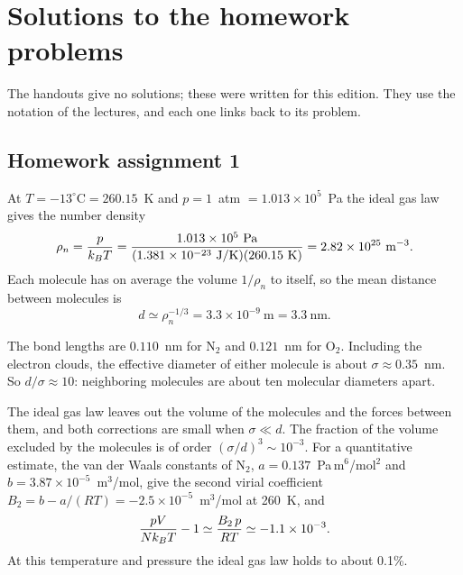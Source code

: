 \section{Solutions to the homework problems}\label{sec:solutions}

The handouts give no solutions; these were written for this edition. They use the notation of the lectures, and each
one links back to its problem.

\subsection{Homework assignment 1}

 At $T = -13^\circ\text{C} = 260.15$~K and $p = 1$~atm $= 1.013\times 10^5$~Pa the ideal gas law gives the
number density
\begin{equation}
  \rho_n = \frac{p}{k_{B} T} = \frac{1.013\times 10^5\ \text{Pa}}{(1.381\times 10^{-23}\ \text{J/K})(260.15\ \text{K})}
  = 2.82\times 10^{25}\ \text{m}^{-3}.
\end{equation}
Each molecule has on average the volume $1/\rho_n$ to itself, so the mean distance between molecules is
\begin{equation}
  d\simeq\rho_n^{-1/3} = 3.3\times 10^{-9}\ \text{m} = 3.3\ \text{nm}.
\end{equation}

 The bond lengths are $0.110$~nm for N$_2$ and $0.121$~nm for O$_2$. Including the electron clouds, the
effective diameter of either molecule is about $\sigma\approx 0.35$~nm. So $d/\sigma\approx 10$: neighboring molecules
are about ten molecular diameters apart.

 The ideal gas law leaves out the volume of the molecules and the forces between them, and both
corrections are small when $\sigma\ll d$. The fraction of the volume excluded by the molecules is of order
$(\sigma/d)^3\sim 10^{-3}$. For a quantitative estimate, the van der Waals constants of N$_2$,
$a = 0.137$~Pa\,m$^6$/mol$^2$ and $b = 3.87\times 10^{-5}$~m$^3$/mol, give the second virial coefficient
$B_2 = b-a/(RT) = -2.5\times 10^{-5}$~m$^3$/mol at 260~K, and
\begin{equation}
  \frac{pV}{Nk_{B} T}-1\simeq\frac{B_2\,p}{RT}\simeq -1.1\times 10^{-3}.
\end{equation}
At this temperature and pressure the ideal gas law holds to about 0.1\%.

